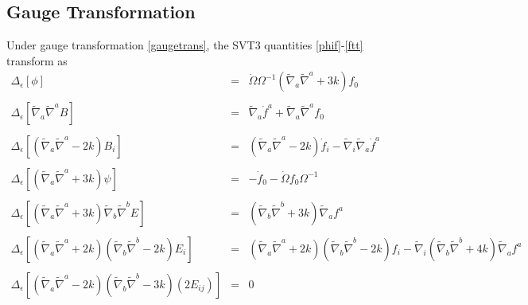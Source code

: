 \documentclass[10pt,letterpaper]{article}
\numberwithin{equation}{section}
\begin{document}
\subsection{Gauge Transformation}
Under gauge transformation \eqref{gaugetrans}, the SVT3 quantities \eqref{phif}-\eqref{ftt} transform as
\begin{eqnarray}
\Delta_\epsilon\left[ \phi \right]&=&  \dot{\Omega} \Omega^{-1} (\tilde{\nabla}_{a}\tilde{\nabla}^{a}+3k)f_{0}{}
\\ \nonumber\\
\Delta_\epsilon\left[ \tilde\nabla_a\tilde\nabla^a B \right] &=& \tilde{\nabla}_{a}\dot{f}^{a} + \tilde{\nabla}_{a}\tilde{\nabla}^{a}f_{0}{}
\\ \nonumber\\
\Delta_\epsilon\left[ (\tilde\nabla_a\tilde\nabla^a -2k)B_i \right] &=& (\tilde{\nabla}_{a}\tilde{\nabla}^{a}-2k)\dot{f}_{i} -  \tilde{\nabla}_{i}\tilde{\nabla}_{a}\dot{f}^{a}
\\ \nonumber\\
\Delta_\epsilon\left[(\tilde\nabla_a\tilde\nabla^a +3 k)\psi \right] &=& - \dot{f}_{0}{} -  \dot{\Omega} f_{0}{} \Omega^{-1}
\\ \nonumber\\
\Delta_\epsilon\left[ (\tilde\nabla_a\tilde\nabla^a +3 k)\tilde\nabla_b\tilde\nabla^b E \right] &=&(\tilde{\nabla}_{b}\tilde{\nabla}^{b}+3k)\tilde{\nabla}_{a}f^{a}
\\ \nonumber\\
\Delta_\epsilon\left[(\tilde\nabla_a\tilde\nabla^a +2 k)(\tilde\nabla_b\tilde\nabla^b-2k) E_i \right] &=& (\tilde\nabla_a\tilde\nabla^a +2 k)(\tilde\nabla_b\tilde\nabla^b-2k)f_{i} -  \tilde{\nabla}_{i}(\tilde{\nabla}_{b}\tilde{\nabla}^{b}+4k)\tilde{\nabla}_{a}f^{a}
\\ \nonumber\\
\Delta_\epsilon\left[(\tilde\nabla_a\tilde\nabla^a-2k)(\tilde\nabla_b\tilde\nabla^b -3k)(2E_{ij}) \right] &=& 0
\end{eqnarray}
\end{document}
